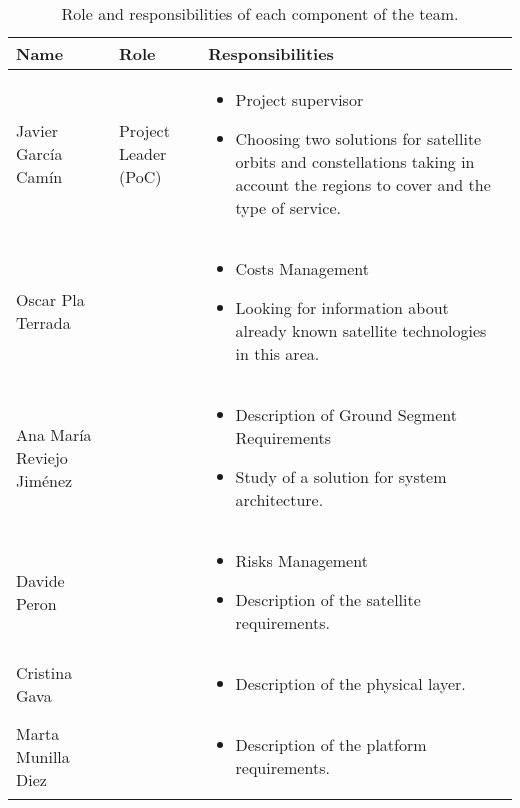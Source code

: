 \documentclass[11pt,a4paper,titlepage]{article}
\begin{document}
{	\begin{table}[ht]
	\small
	\centering
	\renewcommand{\arraystretch}{1}%
	\begin{tabular}{@{}lll@{}}
		\toprule
			Name & Role & Responsibilities\\
		\midrule
			Javier García Camín & Project Leader (PoC) &
			\parbox{7cm}{
				\begin{itemize}
				\item Project supervisor
				\item Choosing two solutions for satellite orbits and constellations taking in account the regions to cover and the type of service.
				\end{itemize}
			}\\ \hline
			Oscar Pla Terrada &  &
			\parbox{7cm}{
				\begin{itemize}
				\item Costs Management
				\item  Looking for information about already known satellite technologies in this area.
				\end{itemize}
			}\\ \hline
			Ana María Reviejo Jiménez &  &
			\parbox{7cm}{
				\begin{itemize}
				\item Description of Ground Segment Requirements
				\item Study of a solution for system architecture.
				\end{itemize}
			}\\ \hline
			Davide Peron &  &
			\parbox{7cm}{
				\begin{itemize}
				\item Risks Management
				\item Description of the satellite requirements.
				\end{itemize}
			}\\ \hline
			Cristina Gava &  &
			\parbox{7cm}{
				\begin{itemize}
				\item Description of the physical layer.
				\end{itemize}
			}\\ \hline
			Marta Munilla Diez &  &
			\parbox{7cm}{
				\begin{itemize}
				\item Description of the platform requirements.
				\end{itemize}
			}\\
		\bottomrule
	\end{tabular}
		\caption{Role and responsibilities of each component of the team.}
		\label{table:roles}
	\end{table}
}
\end{document}
